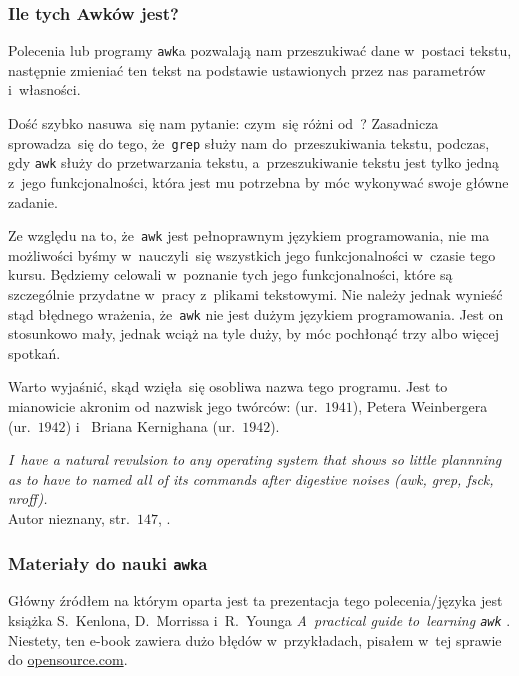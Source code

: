 \documentclass[10pt,t]{beamer}
\begin{document}
\begin{frame}
  \frametitle{Ile tych Awków jest?}


  Polecenia lub programy \texttt{awk}a pozwalają nam przeszukiwać dane
  w~postaci tekstu, następnie zmieniać ten tekst na podstawie ustawionych
  przez nas parametrów i~własności.

  Dość szybko nasuwa~się nam pytanie: czym~się różni
  od~?
  Zasadnicza sprowadza~się do tego, że~\texttt{grep} służy nam
  do~\alert{przeszukiwania} tekstu, podczas, gdy \texttt{awk} służy
  do \alert{przetwarzania} tekstu, a~przeszukiwanie tekstu jest tylko
  jedną z~jego funkcjonalności, która jest mu potrzebna by móc wykonywać
  swoje główne zadanie.

  Ze względu na to, że~\texttt{awk} jest pełnoprawnym językiem
  programowania, nie ma możliwości byśmy w~nauczyli~się wszystkich jego
  funkcjonalności w~czasie tego kursu. Będziemy celowali w~poznanie tych
  jego funkcjonalności, które są szczególnie przydatne w~pracy z~plikami
  tekstowymi. Nie należy jednak wynieść stąd błędnego wrażenia,
  że~\texttt{awk} nie jest dużym językiem programowania. Jest on
  stosunkowo mały, jednak wciąż na tyle duży, by móc pochłonąć trzy albo
  więcej spotkań.

  Warto wyjaśnić, skąd wzięła~się osobliwa nazwa tego programu. Jest to
  mianowicie akronim od nazwisk jego twórców:
  (ur.~$1941$),
  {Petera Weinbergera} (ur.~$1942$)
  i~
  {Briana Kernighana} (ur.~$1942$).

  \textit{I~have a natural revulsion to any operating system that shows so
    little plannning as to have to named all of its commands after digestive
    noises (awk, grep, fsck, nroff).} \\
    Autor nieznany, str.~$147$,
    \parencite{Garfinkel-Weise-Strassmann-The-UNIX-HATERS-Handbook-Pub-1994}.

\end{frame}





\begin{frame}
  \frametitle{Materiały do nauki \texttt{awk}a}



  Główny źródłem na którym oparta jest ta prezentacja tego polecenia/języka
  jest książka S.~Kenlona, D.~Morrissa i~R.~Younga
  {\textit{A~practical guide to~learning \texttt{awk}}}
  \parencite{Kenlon-Morriss-Young-A-practical-guide-to-learning-awk-Ver-2025}.
  Niestety, ten e-book zawiera dużo błędów w~przykładach, pisałem w~tej
  sprawie do \href{opensource.com}{opensource.com}.

\end{frame}
\end{document}
